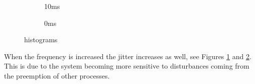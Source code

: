 \begin{figure}
  \centering
  \begin{subfigure}{.45\linewidth}
    \centering
   
    
    \caption{10ms}
    \label{fig:10ms}
  \end{subfigure}
  \begin{subfigure}{.45\linewidth}
    \centering

    
    \caption{0ms}
    \label{fig:0ms}
  \end{subfigure}
\caption{histograms}
\label{fig:histograms}
\end{figure}
%   
% 

When the frequency is increased the jitter increases as well, see Figures \ref{fig:10ms} and \ref{fig:0ms}. This is due to the system becoming more sensitive to disturbances coming from the preemption of other processes.



